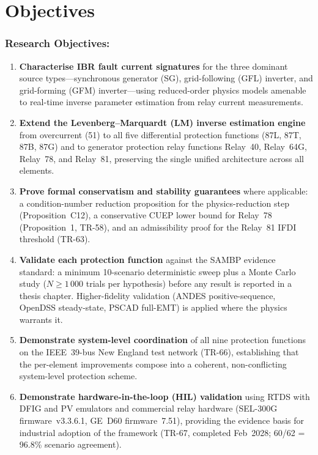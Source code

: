 \documentclass
    [phd,synopsis]
    {iitmdissertation}
\begin{document}
\newpage

\section{Objectives}

\subsubsection{Research Objectives:}

\begin{enumerate}

\item \textbf{Characterise IBR fault current signatures} for the three
  dominant source types---synchronous generator (SG), grid-following (GFL)
  inverter, and grid-forming (GFM) inverter---using reduced-order physics
  models amenable to real-time inverse parameter estimation from relay
  current measurements.

\item \textbf{Extend the Levenberg--Marquardt (LM) inverse estimation
  engine} from overcurrent (51) to all five differential protection
  functions (87L, 87T, 87B, 87G) and to generator protection relay
  functions Relay~40, Relay~64G, Relay~78, and Relay~81,
  preserving the single unified architecture across all elements.

\item \textbf{Prove formal conservatism and stability guarantees} where
  applicable: a condition-number reduction proposition for the
  physics-reduction step (Proposition~C12), a conservative CUEP lower bound
  for Relay~78 (Proposition~1, TR-58), and an admissibility proof for the
  Relay~81 IFDI threshold (TR-63).

\item \textbf{Validate each protection function} against the SAMBP evidence
  standard: a minimum 10-scenario deterministic sweep plus a Monte Carlo
  study ($N \geq 1\,000$ trials per hypothesis) before any result is
  reported in a thesis chapter.
  Higher-fidelity validation (ANDES positive-sequence, OpenDSS steady-state,
  PSCAD full-EMT) is applied where the physics warrants it.

\item \textbf{Demonstrate system-level coordination} of all nine protection
  functions on the IEEE~39-bus New England test network (TR-66), establishing
  that the per-element improvements compose into a coherent, non-conflicting
  system-level protection scheme.

\item \textbf{Demonstrate hardware-in-the-loop (HIL) validation} using
  RTDS with DFIG and PV emulators and commercial relay hardware
  (SEL-300G firmware~v3.3.6.1, GE~D60 firmware~7.51), providing the
  evidence basis for industrial adoption of the framework
  (TR-67, completed Feb~2028; 60/62 = 96.8\% scenario agreement).

\end{enumerate}
\end{document}
